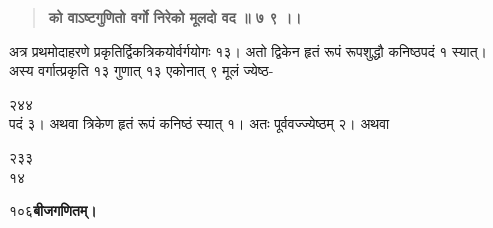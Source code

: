\documentclass[11pt, openany]{book}
\begin{document}
\begin{sloppypar}
\begin{quote}
\hspace{0.5in}\textbf{को वाऽष्टगुणितो वर्गो निरेको मूलदो वद ॥ ७ ९ ।।}
\end{quote}

\hangindent=0.2in \hspace{0.2in}अत्र प्रथमोदाहरणे प्रकृतिर्द्विकत्रिकयोर्वर्गयोगः १३। अतो द्विकेन हृतं रूपं रूपशुद्धौ कनिष्ठपदं १ स्यात्। अस्य वर्गात्प्रकृति १३ गुणात् १३ एकोनात् ९ मूलं ज्येष्ठ-

२\hspace{2.3in}४\hspace{0.7in}४\\

\hangindent=0.2in पदं ३। अथवा त्रिकेण हृतं रूपं कनिष्ठं स्यात् १। अतः पूर्ववज्ज्येष्ठम् २। अथवा

\hspace{0.25in}२\hspace{2.5in}३\hspace{1.3in}३\\

\hspace{0.5in}१४
\end{sloppypar}
\thispagestyle{empty}
\newpage

\onehalfspacing
१०६\hspace{2in}\textbf{बीजगणितम्।}

\vspace{5mm}
\end{document}
